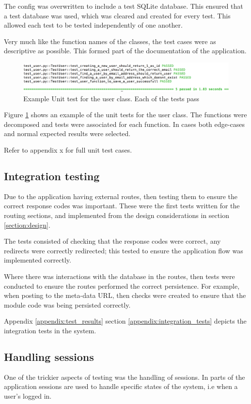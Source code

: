 The config was overwritten to include a test SQLite database. This ensured that a test database was used, which was cleared and created for every test. This allowed each test to be tested independently of one another.

Very much like the function names of the classes, the test cases were as descriptive as possible. This formed part of the documentation of the application.

\begin{figure}[h!]
  \centering
  \includegraphics[width=\textwidth]{images/unit_test_user}
  \caption{Example Unit test for the user class. Each of the tests pass}
  \label{fig:unit_user}
\end{figure}

Figure \ref{fig:unit_user} shows an example of the unit tests for the user class. The functions were decomposed and tests were associated for each function. In cases both edge-cases and normal expected results were selected.

Refer to appendix x for full unit test cases.

\subsection{Integration testing}
Due to the application having external routes, then testing them to ensure the correct response codes was important. These were the first tests written for the routing sections, and implemented from the design considerations in section \ref{section:design}.

The tests consisted of checking that the response codes were correct, any redirects were correctly redirected; this tested to ensure the application flow was implemented correctly.

Where there was interactions with the database in the routes, then tests were conducted to ensure the routes performed the correct persistence. For example, when posting to the meta-data URL, then checks were created to ensure that the module code was being persisted correctly.

Appendix \ref{appendix:test_results} section \ref{appendix:integration_tests} depicts the integration tests in the system.

\subsection{Handling sessions}
One of the trickier aspects of testing was the handling of sessions. In parts of the application sessions are used to handle specific states of the system, i.e when a user's logged in.

